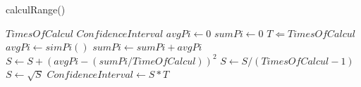 \documentclass[11pt]{ctexart}
\begin{document}
\renewcommand{\thealgorithm}{3} %
    \begin{algorithm}
        \caption{calculRange()} %
        \begin{algorithmic}[1] %
            \Require $TimesOfCalcul$
            \Ensure $ConfidenceInterval$
            \State $avgPi \leftarrow 0$
            \State $sumPi \leftarrow 0$
            \State $T \Leftarrow TimesOfCalcul$
                \State $avgPi \leftarrow simPi()$
                \State $sumPi \leftarrow sumPi + avgPi$
            \EndFor
                \State $S \leftarrow S+(avgPi-(sumPi/TimeOfCalcul))^2$
            \EndFor
            \State $S \leftarrow S/(TimesOfCalcul-1)$
            \State $S \leftarrow \sqrt S$
            \State $ConfidenceInterval \leftarrow S \ast T$
        \end{algorithmic}
    \end{algorithm}
\end{document}
